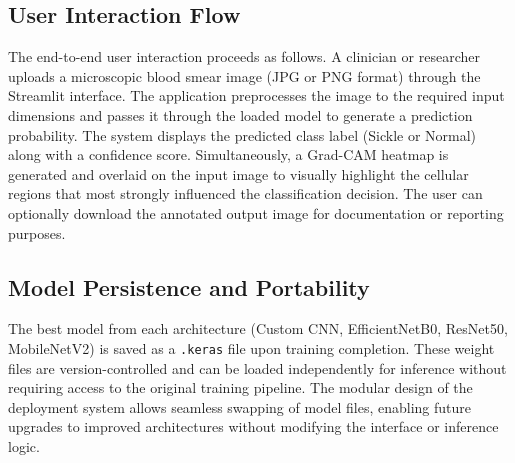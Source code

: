 \subsection{User Interaction Flow}

The end-to-end user interaction proceeds as follows. A clinician or researcher uploads a microscopic blood smear image (JPG or PNG format) through the Streamlit interface. The application preprocesses the image to the required input dimensions and passes it through the loaded model to generate a prediction probability. The system displays the predicted class label (Sickle or Normal) along with a confidence score. Simultaneously, a Grad-CAM heatmap is generated and overlaid on the input image to visually highlight the cellular regions that most strongly influenced the classification decision. The user can optionally download the annotated output image for documentation or reporting purposes.

\subsection{Model Persistence and Portability}

The best model from each architecture (Custom CNN, EfficientNetB0, ResNet50, MobileNetV2) is saved as a \texttt{.keras} file upon training completion. These weight files are version-controlled and can be loaded independently for inference without requiring access to the original training pipeline. The modular design of the deployment system allows seamless swapping of model files, enabling future upgrades to improved architectures without modifying the interface or inference logic.
